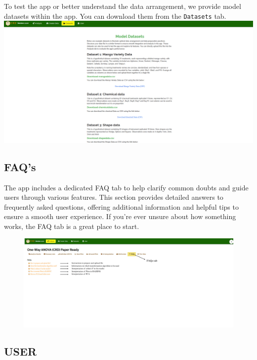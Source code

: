 \documentclass[
  letterpaper,
  DIV=11,
  numbers=noendperiod]{scrartcl}
\begin{document}
To test the app or better understand the data arrangement, we provide
model datasets within the app. You can download them from the
\texttt{Datasets} tab. \includegraphics{modeldata.webp}

\hypertarget{sec-FAQ}{%
\subsection{FAQ's}\label{sec-FAQ}}

The app includes a dedicated FAQ tab to help clarify common doubts and
guide users through various features. This section provides detailed
answers to frequently asked questions, offering additional information
and helpful tips to ensure a smooth user experience. If you're ever
unsure about how something works, the FAQ tab is a great place to start.

\begin{figure}

{\centering \includegraphics{2.webp}

}

\end{figure}

\hypertarget{sec-USER}{%
\subsection{USER}\label{sec-USER}}
\end{document}

